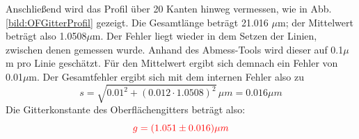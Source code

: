 Anschließend wird das Profil über 20 Kanten hinweg vermessen, wie in Abb. \ref{bild:OFGitterProfil} gezeigt. Die Gesamtlänge beträgt 
21.016 $\mu$m; der Mittelwert beträgt also 1.0508$\mu$m. 
Der Fehler liegt wieder in dem Setzen der Linien, zwischen denen gemessen wurde. Anhand des Abmess-Tools wird dieser auf 0.1$\mu$m pro 
Linie geschätzt. Für den Mittelwert ergibt sich demnach ein Fehler von 0.01$\mu$m. Der Gesamtfehler ergibt sich mit dem internen Fehler also zu
\begin{equation*}
    s = \sqrt{0.01^2 + (0.012 \cdot 1.0508)^2}\, \mu m = 0.016 \mu m
\end{equation*}
Die Gitterkonstante des Oberflächengitters beträgt also:
\begin{equation*}
    \textcolor{red}{g = (1.051 \pm 0.016) \mu m}
\end{equation*}